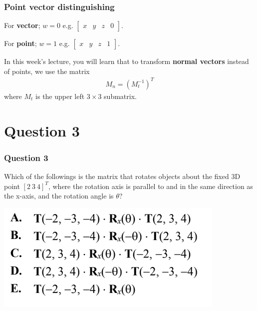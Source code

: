 \documentclass{beamer}
\begin{document}
\begin{frame}
    \frametitle{Point vector distinguishing}

    For \textbf{vector}; $w = 0$ \quad e.g. $\left[ \begin{matrix}
        x & y & z & 0
    \end{matrix} \right]$.

    For \textbf{point}; $w = 1$ \quad e.g. $\left[ \begin{matrix}
        x & y & z & 1
    \end{matrix} \right]$.

    \begin{tcolorbox}
        In this week's lecture, you will learn that to transform \textbf{normal vectors} instead of points,
        we use the matrix
        \begin{eqnarray*}
            M_n = (M_t^{-1})^T
        \end{eqnarray*}
        where $M_t$ is the upper left $3 \times 3$ submatrix.
    \end{tcolorbox}

\end{frame}

\section{Question 3}

\begin{frame}
    \frametitle{Question 3}

    Which of the followings is the matrix that rotates objects about the fixed 3D point 
    $[2 \  3 \  4]^T$, where the rotation axis is parallel to and in the same direction 
    as the x-axis, and the rotation angle is $\theta$? 

    \begin{center}
        \includegraphics[scale=0.6]{q3-options.png}
    \end{center}

\end{frame}
\end{document}
